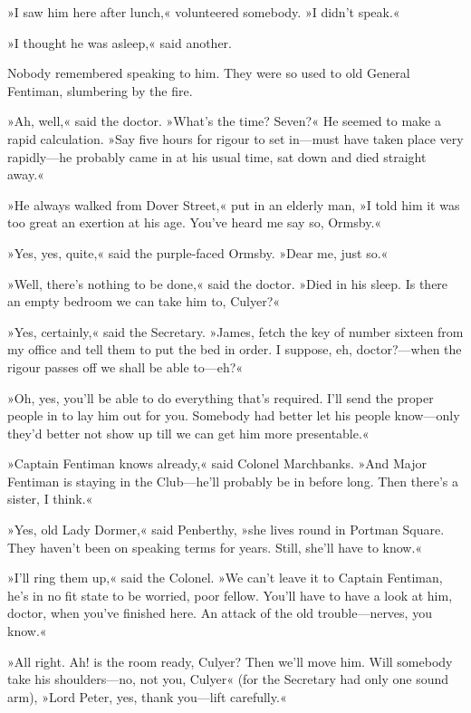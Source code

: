 »I saw him here after lunch,« volunteered somebody. »I didn't speak.«

»I thought he was asleep,« said another.

Nobody remembered speaking to him. They were so used to old General Fentiman, slumbering by the fire.

»Ah, well,« said the doctor. »What's the time? Seven?« He seemed to make a rapid calculation. »Say five hours for rigour to set in\allowbreak---\allowbreak must have taken place very rapidly\allowbreak---\allowbreak he probably came in at his usual time, sat down and died straight away.«

»He always walked from Dover Street,« put in an elderly man, »I told him it was too great an exertion at his age. You've heard me say so, Ormsby.«

»Yes, yes, quite,« said the purple-faced Ormsby. »Dear me, just so.«

»Well, there's nothing to be done,« said the doctor. »Died in his sleep. Is there an empty bedroom we can take him to, Culyer?«

»Yes, certainly,« said the Secretary. »James, fetch the key of number sixteen from my office and tell them to put the bed in order. I suppose, eh, doctor?---when the rigour passes off we shall be able to\allowbreak---\allowbreak eh?«

»Oh, yes, you'll be able to do everything that's required. I'll send the proper people in to lay him out for you. Somebody had better let his people know\allowbreak---\allowbreak only they'd better not show up till we can get him more presentable.«

»Captain Fentiman knows already,« said Colonel Marchbanks. »And Major Fentiman is staying in the Club\allowbreak---\allowbreak he'll probably be in before long. Then there's a sister, I think.«

»Yes, old Lady Dormer,« said Penberthy, »she lives round in Portman Square. They haven't been on speaking terms for years. Still, she'll have to know.«

»I'll ring them up,« said the Colonel. »We can't leave it to Captain Fentiman, he's in no fit state to be worried, poor fellow. You'll have to have a look at him, doctor, when you've finished here. An attack of the old trouble\allowbreak---\allowbreak nerves, you know.«

»All right. Ah! is the room ready, Culyer? Then we'll move him. Will somebody take his shoulders\allowbreak---\allowbreak no, not you, Culyer« (for the Secretary had only one sound arm), »Lord Peter, yes, thank you\allowbreak---\allowbreak lift carefully.«

